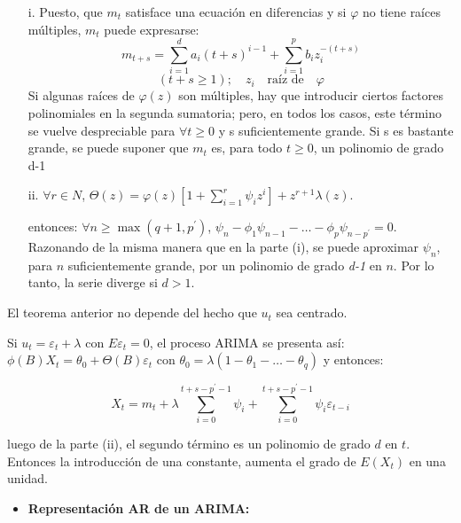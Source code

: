 \begin{enumerate}
      \item[i.] Puesto, que $m_{t}$ satisface una ecuaci\'{o}n en diferencias y si $\varphi$ no tiene ra\'{i}ces m\'{u}ltiples, $m_{t}$ puede expresarse:
      \[
      m_{t+s} =\sum_{i=1}^d a_{i} (t+s)^{i-1}+\sum_{i=1}^p b_{i} z_{i}^{-(t+s)} 
      \]
      \[
      (t+s\geq 1); \quad z_{i} \quad \text{ra\'{i}z de}\quad  \varphi
      \]
      Si algunas ra\'{i}ces de $\varphi (z)$ son m\'{u}ltiples, hay que introducir ciertos factores polinomiales en la segunda sumatoria; pero, en todos los casos, este t\'{e}rmino se vuelve despreciable para $\forall t\geq 0$ y s suficientemente grande.\newline
      Si s es bastante grande, se puede suponer que $m_{t}$ es, para todo $t\geq 0$, un polinomio de grado d-1
      \item[ii.] $\forall r\in N$, $\Theta (z)=\varphi (z)\left[1+\displaystyle\sum_{i=1}^r \psi_{i} z^{i} \right]+z^{r+1}\lambda (z)$.\newline
      
      entonces: $\forall n\geq \max (q+1, p^{'})$, $\psi_{n} -\phi_{1} \psi_{n-1} -\ldots-\phi_{p} \psi_{n-p^{'}} =0$.\newline
      Razonando de la misma manera que en la parte (i), se puede aproximar $\psi_{n}$, para $n$ suficientemente grande, por un polinomio de grado \textit{d-1} en $n$. Por lo tanto, la serie diverge si $d>1$.
\end{enumerate}

El teorema anterior no depende del hecho que $u_{t}$ sea centrado.\newline


Si $u_{t} =\varepsilon_{t} +\lambda$ con $E\varepsilon_{t} =0$, el proceso ARIMA se presenta así: $\phi (B)X_{t} =\theta_{0} +\Theta (B)\varepsilon_{t}$ con $\theta_{0} =\lambda (1-\theta_{1} -\ldots-\theta_{q} )$ y entonces:

\[
X_{t} =m_{t} +\lambda \sum_{i=0}^{t+s-p^{'}-1} \psi_{i} + \sum_{i=0}^{t+s-p^{'}-1}\psi_{i} \varepsilon_{t-i}
\]

luego de la parte (ii), el segundo t\'{e}rmino es un polinomio de grado $d$ en $t$. Entonces la introducci\'{o}n de una constante, aumenta el grado de $E (X_{t})$ en una unidad.

\begin{itemize}
      \item \textbf{Representaci\'{o}n AR de un ARIMA:}
\end{itemize}

